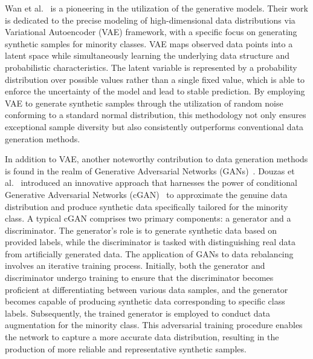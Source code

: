 Wan et al.~\cite{8285168} is a pioneering in the utilization of the generative models. Their work is dedicated to the precise modeling of high-dimensional data distributions via Variational Autoencoder (VAE) framework, with a specific focus on generating synthetic samples for minority classes. VAE maps observed data points into a latent space while simultaneously learning the underlying data structure and probabilistic characteristics. The latent variable is represented by a probability distribution over possible values rather than a single fixed value, which is able to enforce the uncertainty of the model and lead to stable prediction. By employing VAE to generate synthetic samples through the utilization of random noise conforming to a standard normal distribution, this methodology not only ensures exceptional sample diversity but also consistently outperforms conventional data generation methods.

In addition to VAE, another noteworthy contribution to data generation methods is found in the realm of Generative Adversarial Networks (GANs)~\cite{goodfellow2020generative}. Douzas et al.~\cite{douzas2018effective} introduced an innovative approach that harnesses the power of conditional Generative Adversarial Networks (cGAN)~\cite{mirza2014conditional} to approximate the genuine data distribution and produce synthetic data specifically tailored for the minority class. A typical cGAN comprises two primary components: a generator and a discriminator. The generator's role is to generate synthetic data based on provided labels, while the discriminator is tasked with distinguishing real data from artificially generated data. The application of GANs to data rebalancing involves an iterative training process. Initially, both the generator and discriminator undergo training to ensure that the discriminator becomes proficient at differentiating between various data samples, and the generator becomes capable of producing synthetic data corresponding to specific class labels. Subsequently, the trained generator is employed to conduct data augmentation for the minority class. This adversarial training procedure enables the network to capture a more accurate data distribution, resulting in the production of more reliable and representative synthetic samples. 

